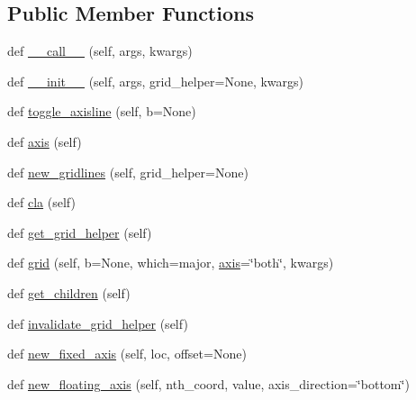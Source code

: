 \subsection*{Public Member Functions}
\begin{DoxyCompactItemize}
\item 
def \hyperlink{classaxisartist_1_1axislines_1_1Axes_a33d4044749390f734cb16c0a85456011}{\+\_\+\+\_\+call\+\_\+\+\_\+} (self, args, kwargs)
\item 
def \hyperlink{classaxisartist_1_1axislines_1_1Axes_a93ac6b7d0ce6b9c500413af11be6eb85}{\+\_\+\+\_\+init\+\_\+\+\_\+} (self, args, grid\+\_\+helper=None, kwargs)
\item 
def \hyperlink{classaxisartist_1_1axislines_1_1Axes_a1ac91fb93eb257ecf56a537fa43f0673}{toggle\+\_\+axisline} (self, b=None)
\item 
def \hyperlink{classaxisartist_1_1axislines_1_1Axes_a0f2468d1ddd744da6d274de67eb9d4dd}{axis} (self)
\item 
def \hyperlink{classaxisartist_1_1axislines_1_1Axes_ad8f19846c3e6e081b93baa6951d597f7}{new\+\_\+gridlines} (self, grid\+\_\+helper=None)
\item 
def \hyperlink{classaxisartist_1_1axislines_1_1Axes_a266142c8571bd83efc9fdc79bd779c3e}{cla} (self)
\item 
def \hyperlink{classaxisartist_1_1axislines_1_1Axes_ade0f38df95c0463a772d0d898ae94a27}{get\+\_\+grid\+\_\+helper} (self)
\item 
def \hyperlink{classaxisartist_1_1axislines_1_1Axes_a9687642a78eb668e48254ee32b84eda0}{grid} (self, b=None, which=\textquotesingle{}major\textquotesingle{}, \hyperlink{classaxisartist_1_1axislines_1_1Axes_a0f2468d1ddd744da6d274de67eb9d4dd}{axis}=\char`\"{}both\char`\"{}, kwargs)
\item 
def \hyperlink{classaxisartist_1_1axislines_1_1Axes_a9c715f49e3158f7d21250597925b660c}{get\+\_\+children} (self)
\item 
def \hyperlink{classaxisartist_1_1axislines_1_1Axes_a766657c17b6ce1e2f67047ace2197753}{invalidate\+\_\+grid\+\_\+helper} (self)
\item 
def \hyperlink{classaxisartist_1_1axislines_1_1Axes_a92ab7727d3154cabba9c5be6a18e52ca}{new\+\_\+fixed\+\_\+axis} (self, loc, offset=None)
\item 
def \hyperlink{classaxisartist_1_1axislines_1_1Axes_a7f12095d28d8724ac2d55b982c064156}{new\+\_\+floating\+\_\+axis} (self, nth\+\_\+coord, value, axis\+\_\+direction=\char`\"{}bottom\char`\"{})
\end{DoxyCompactItemize}

